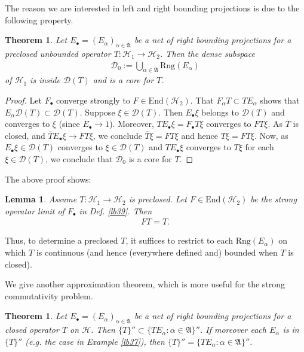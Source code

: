 \documentclass[12pt,a4paper,notitlepage]{article}
\theoremstyle{definition}
\theoremstyle{plain}
\newtheorem{thm}[df]{Theorem}
\newtheorem{lm}[df]{Lemma}
\newcommand{\fk}{\mathfrak}
\newcommand{\mc}{\mathcal}
\newcommand{\ovl}{\overline}
\newcommand{\End}{\mathrm{End}} %
\newcommand{\Dom}{\scr D}
\newcommand{\scr}{\mathscr}
\newcommand{\blt}{\bullet}
\newcommand{\Rng}{\mathrm{Rng}}
\numberwithin{equation}{section}
\begin{document}
The reason we are interested in left and right bounding projections is due to the following property.

\begin{thm}\label{lb44}
Let $E_\blt=(E_\alpha)_{\alpha\in\fk A}$ be a net of right bounding projections for a preclosed unbounded operator $T:\mc H_1\rightarrow\mc H_2$. Then the dense subspace
\begin{align*}
\Dom_0:=\bigcup_{\alpha\in\fk A}\Rng(E_\alpha)	
\end{align*}
of $\mc H_1$ is inside $\Dom(T)$ and is a core for $T$.
\end{thm}


\begin{proof}
Let $F_\blt$ converge strongly to $F\in\End(\mc H_2)$. That $F_\alpha T\subset TE_\alpha$ shows that $E_\alpha\Dom(T)\subset\Dom(T)$. Suppose $\xi\in\Dom(T)$. Then $E_\blt\xi$ belongs to $\Dom(T)$ and converges to $\xi$ (since $E_\blt\rightarrow 1$). Moreover, $TE_\blt\xi=F_\blt T\xi$ converges  to $FT\xi$.  As $\ovl T$ is closed, and $\ovl TE_\blt\xi\rightarrow FT\xi$, we conclude $\ovl T\xi=FT\xi$ and hence $T\xi=F T\xi$. Now, as $E_\blt\xi\in\Dom(T)$ converges to  $\xi\in\Dom(T)$ and $TE_\blt\xi$ converges to $T\xi$ for each $\xi\in\Dom(T)$, we conclude that $\Dom_0$ is a core for $T$.
\end{proof}

The above proof shows:

\begin{lm}\label{lb40}
Assume $T:\mc H_1\rightarrow\mc H_2$ is preclosed. Let $F\in\End(\mc H_2)$ be the strong operator limit of $F_\blt$ in Def. \ref{lb39}. Then
\begin{align}
FT=T.	
\end{align}
\end{lm}


Thus, to determine a preclosed $T$, it suffices to restrict to each $\Rng(E_\alpha)$ on which $T$ is continuous (and hence (everywhere defined and) bounded when $T$ is closed).


We give another approximation theorem, which is more useful for the strong commutativity problem.

\begin{thm}\label{lb41}
Let $E_\blt=(E_\alpha)_{\alpha\in\fk A}$ be a net of right bounding projections for a closed operator $T$ on $\mc H$. Then $\{T\}''\subset \{TE_\alpha:\alpha\in\fk A\}''$. If moreover each $E_\alpha$ is in $\{T\}''$ (e.g. the case in Example \ref{lb37}), then $\{T\}''=\{TE_\alpha:\alpha\in\fk A\}''$.
\end{thm}
\end{document}
